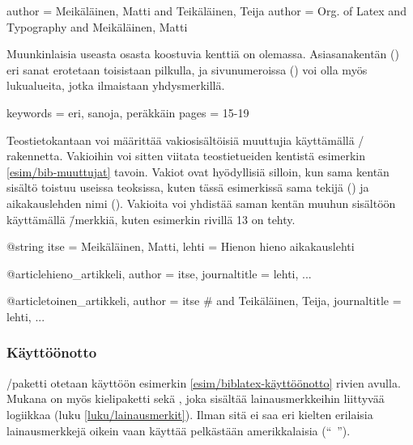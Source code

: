 \begin{koodilohkosis}
author = {Meikäläinen, Matti and Teikäläinen, Teija}
author = {{Org. of Latex and Typography} and Meikäläinen, Matti}
\end{koodilohkosis}

\noindent
Muunkinlaisia useasta osasta koostuvia kenttiä on olemassa.
Asiasanakentän () eri sanat erotetaan toisistaan
pilkulla, ja sivunumeroissa () voi olla myös lukualueita,
jotka ilmaistaan yhdysmerkillä.

\begin{koodilohkosis}
keywords = {eri, sanoja, peräkkäin}
pages = {15-19}
\end{koodilohkosis}

\noindent
Teostietokantaan voi määrittää vakiosisältöisiä muuttujia käyttämällä
\-/ rakennetta. Vakioihin voi sitten viitata
teostietueiden kentistä esimerkin \ref{esim/bib-muuttujat} tavoin.
Vakiot ovat hyödyllisiä silloin, kun sama kentän sisältö toistuu useissa
teoksissa, kuten tässä esimerkissä sama tekijä () ja
aikakauslehden nimi (). Vakioita voi yhdistää
saman kentän muuhun sisältöön käyttämällä \koodi{\#}\=/merkkiä, kuten
esimerkin rivillä 13 on tehty.

\begin{esimerkki*}
\begin{koodilohko}
@string{
  itse = {Meikäläinen, Matti},
  lehti = {Hienon hieno aikakauslehti}
}

@article{hieno_artikkeli,
  author = itse,
  journaltitle = lehti,
  ...
}

@article{toinen_artikkeli,
  author = itse # { and Teikäläinen, Teija},
  journaltitle = lehti,
  ...
}
\end{koodilohko}
  \caption{Muuttujien käyttö ja \-/rakenne}
  \label{esim/bib-muuttujat}
\end{esimerkki*}

\subsubsection{Käyttöönotto}

\-/paketti otetaan käyttöön esimerkin
\ref{esim/biblatex-käyttöönotto} rivien avulla. Mukana on myös
kielipaketti sekä , joka sisältää lainausmerkkeihin
liittyvää logiikkaa (luku \ref{luku/lainausmerkit}). Ilman sitä
 ei saa eri kielten erilaisia lainausmerkkejä oikein
vaan käyttää pelkästään amerikkalaisia (``~'').

